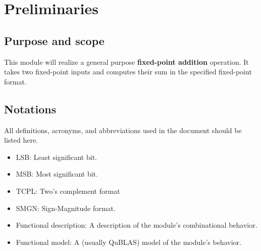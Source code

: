\documentclass[a4paper, oneside]{report}
\author{Bolin Li and Yifang Dai}
\date{2025/3/26}
\begin{document}
    \setmainfont{TeX Gyre Heros}
    \maketitle
    \tableofcontents
    \thispagestyle{empty}
    \clearpage
    \pagestyle{fancy}
    \setcounter{page}{1}
    \chapter{Preliminaries}
        \section{Purpose and scope}
        This module will realize a general purpose \textbf{fixed-point addition} operation. It takes two fixed-point inputs and computes their sum in the specified fixed-point format.
        \section{Notations}
            All definitions, acronyms, and abbreviations used in the document should be listed here.
            \begin{itemize}
                \item LSB: Least significant bit.
                \item MSB: Most significant bit.
                \item TCPL: Two's complement format
                \item SMGN: Sign-Magnitude format.
                \item Functional description: A description of the module's combinational behavior.
                \item Functional model: A (usually QuBLAS) model of the module's behavior.
            \end{itemize}
\end{document}
